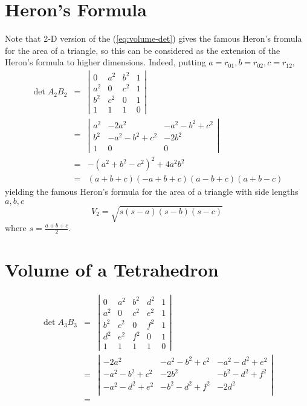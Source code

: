 \documentclass{article}
\begin{document}
\section{Heron's Formula}
\label{sec-2}
Note that 2-D version of the (\ref{eq:volume-det}) gives the famous Heron's fromula for the area of a triangle, so this can be considered as the extension of the Heron's formula to higher dimensions.
Indeed, putting $a=r_{01},b=r_{02},c=r_{12}$,
\begin{eqnarray}
\det{A_{2}B_{2}}
&=& \left|\begin{array}{cccc}
0        & a^2 & b^2   & 1 \\
a^2 & 0        & c^2  & 1 \\
b^2 & c^2 & 0         & 1 \\
1        & 1        & 1         & 0
\end{array}\right|\\
&=& \left|\begin{array}{ccc}
a^2 & -2a^{2}  & -a^{2} -b^{2} + c^2   \\
b^2 & -a^{2} -b^{2} + c^2 & -2b^{2}    \\
1        & 0    & 0
\end{array}\right|\\
&=& -(a^2 + b^2 -c^2)^2 + 4 a^2 b^2 \\
&=& (a + b + c)(-a +b+c)(a-b+c)(a+b-c)
\end{eqnarray}
yielding the famous Heron's formula for the area of a triangle with side lengths $a,b,c$
\begin{equation}
V_{2} = \sqrt{s(s-a)(s-b)(s-c)}
\end{equation}
where $s=\frac{a+b+c}{2}$.
\section{Volume of a Tetrahedron}
\label{sec-3}
\begin{eqnarray}
\det{A_{3}B_{3}}
&=& \left|\begin{array}{ccccc}
0        & a^2 & b^2  & d^{2} & 1 \\
a^2 & 0        & c^2  & e^{2} &1 \\
b^2 & c^2 & 0         & f^{2} &1 \\
d^{2} & e^{2} & f^{2} &0 & 1 \\
1        & 1        & 1  &1      & 0
\end{array}\right|\\
&=& \left|\begin{array}{ccc}
 -2a^{2}             & -a^{2} -b^{2} + c^2    & -a^{2} -d^{2} + e^2   \\
 -a^{2} -b^{2} + c^2 & -2b^{2}                & -b^{2} -d^{2} + f^2 \\
 -a^{2} -d^{2} + e^2 & -b^{2} - d^{2} + f^{2} & -2d^{2}  \\
\end{array}\right|\\
&=&
\end{eqnarray}
\end{document}
